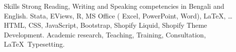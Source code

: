 
\begin{rubric}{Skills}
\entry*[Languages]
	Strong Reading, Writing and Speaking competencies in Bengali and English.
	Stata, EViews, R, MS Office ( Excel, PowerPoint, Word), \LaTeX, \ldots
{}
	\textsc{HTML, CSS}, JavaScript, Bootstrap, Shopify Liquid, Shopify Theme Development.
\entry*[Misc.]
	Academic research, Teaching, Training, Consultation, \LaTeX\ Typesetting.
\end{rubric}
